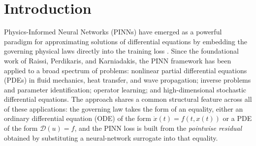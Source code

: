 \documentclass[11pt]{elsarticle}
\theoremstyle{definition}
\theoremstyle{remark}
\numberwithin{equation}{section}
\begin{document}
	\tableofcontents
	\newpage
	
	\section{Introduction}
	\label{sec:intro}
	
	Physics-Informed Neural Networks (PINNs) have emerged as a powerful
	paradigm for approximating solutions of differential equations by
	embedding the governing physical laws directly into the training loss
	\cite{raissi2019}.  Since the foundational work of Raissi, Perdikaris,
	and Karniadakis, the PINN framework has been applied to a broad spectrum
	of problems: nonlinear partial differential equations (PDEs) in fluid
	mechanics, heat transfer, and wave propagation; inverse problems and
	parameter identification; operator learning; and high-dimensional
	stochastic differential equations.  The approach shares a common
	structural feature across all of these applications: the governing law
	takes the form of an equality, either an ordinary differential equation
	(ODE) of the form $\dot{x}(t) = f(t,x(t))$ or a PDE of the form
	$\mathcal{D}(u) = f$, and the PINN loss is built from the \emph{pointwise
		residual} obtained by substituting a neural-network surrogate into that
	equality.
	
\end{document}
